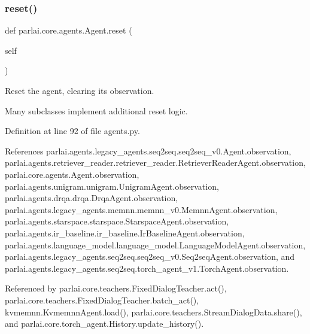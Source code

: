 \subsubsection{\texorpdfstring{reset()}{reset()}}
{\footnotesize\ttfamily def parlai.\+core.\+agents.\+Agent.\+reset (\begin{DoxyParamCaption}\item[{}]{self }\end{DoxyParamCaption})}

\begin{DoxyVerb}Reset the agent, clearing its observation.

Many subclasses implement additional reset logic.
\end{DoxyVerb}
 

Definition at line 92 of file agents.\+py.



References parlai.\+agents.\+legacy\+\_\+agents.\+seq2seq.\+seq2seq\+\_\+v0.\+Agent.\+observation, parlai.\+agents.\+retriever\+\_\+reader.\+retriever\+\_\+reader.\+Retriever\+Reader\+Agent.\+observation, parlai.\+core.\+agents.\+Agent.\+observation, parlai.\+agents.\+unigram.\+unigram.\+Unigram\+Agent.\+observation, parlai.\+agents.\+drqa.\+drqa.\+Drqa\+Agent.\+observation, parlai.\+agents.\+legacy\+\_\+agents.\+memnn.\+memnn\+\_\+v0.\+Memnn\+Agent.\+observation, parlai.\+agents.\+starspace.\+starspace.\+Starspace\+Agent.\+observation, parlai.\+agents.\+ir\+\_\+baseline.\+ir\+\_\+baseline.\+Ir\+Baseline\+Agent.\+observation, parlai.\+agents.\+language\+\_\+model.\+language\+\_\+model.\+Language\+Model\+Agent.\+observation, parlai.\+agents.\+legacy\+\_\+agents.\+seq2seq.\+seq2seq\+\_\+v0.\+Seq2seq\+Agent.\+observation, and parlai.\+agents.\+legacy\+\_\+agents.\+seq2seq.\+torch\+\_\+agent\+\_\+v1.\+Torch\+Agent.\+observation.



Referenced by parlai.\+core.\+teachers.\+Fixed\+Dialog\+Teacher.\+act(), parlai.\+core.\+teachers.\+Fixed\+Dialog\+Teacher.\+batch\+\_\+act(), kvmemnn.\+Kvmemnn\+Agent.\+load(), parlai.\+core.\+teachers.\+Stream\+Dialog\+Data.\+share(), and parlai.\+core.\+torch\+\_\+agent.\+History.\+update\+\_\+history().

